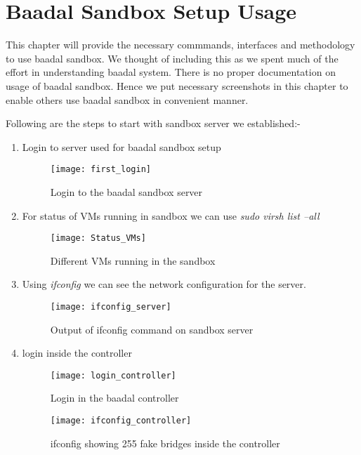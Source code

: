 \chapter{Baadal Sandbox Setup Usage}

This chapter will provide the necessary commmands, interfaces and methodology to use baadal sandbox. We thought of including this as we spent much of the effort in understanding baadal system. There is no proper documentation on usage of baadal sandbox. Hence we put necessary screenshots in this chapter to enable others use baadal sandbox in convenient manner.

Following are the steps to start with sandbox server we established:-

\begin{enumerate}
    \item Login to server used for baadal sandbox setup
    
\begin{figure}[h]
\centering
\texttt{[image: first\_login]}
\caption{Login to the baadal sandbox server}
\end{figure}

\newpage
\item For status of VMs running in sandbox we can use \textit{sudo virsh list --all}
\begin{figure}[h]
\caption{Different VMs running in the sandbox}
\centering
\texttt{[image: Status\_VMs]}
\end{figure}


\item Using \textit{ifconfig} we can see the network configuration for the server.
\begin{figure}[h]
\caption{Output of ifconfig command on sandbox server}
\centering
\texttt{[image: ifconfig\_server]}
\end{figure}

\newpage
\item login inside the controller

\begin{figure}[h]
\caption{Login in the baadal controller}
\centering
\texttt{[image: login\_controller]}
\end{figure}


\begin{figure}[h]
\caption{ifconfig showing 255 fake bridges inside the controller}
\centering
\texttt{[image: ifconfig\_controller]}
\end{figure}


\end{enumerate}

